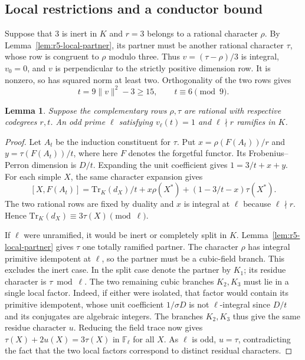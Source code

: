 \documentclass[11pt,a4paper]{article}
\newtheorem{lemma}[theorem]{Lemma}
\numberwithin{equation}{section}
\begin{document}
\subsection{Local restrictions and a conductor bound}
Suppose that $3$ is inert in $K$ and $r=3$ belongs to a rational
character $\rho$. By Lemma~\ref{lem:r5-local-partner}, its partner must
be another rational character $\tau$, whose row is congruent to
$\rho$ modulo three. Thus $v=(\tau-\rho)/3$ is integral,
$v_0=0$, and $v$ is perpendicular to the strictly positive dimension
row. It is nonzero, so has squared norm at least two. Orthogonality
of the two rows gives
\[
 t=9\|v\|^2-3\ge15,\qquad t\equiv6\pmod9.                  \tag{*}
\]
\begin{lemma}\label{lem:r5-odd-partner}
Suppose the complementary rows $\rho,\tau$ are rational with respective
codegrees $r,t$. An odd prime $\ell$ satisfying
$v_\ell(t)=1$ and $\ell\nmid r$ ramifies in $K$.
\end{lemma}
\begin{proof}
Let $A_t$ be the induction constituent for $\tau$. Put
$x=\rho(F(A_t))/r$ and $y=\tau(F(A_t))/t$, where here $F$ denotes
the forgetful functor. Its Frobenius--Perron dimension is $D/t$.
Expanding the unit coefficient gives $1=3/t+x+y$. For each simple
$X$, the same character expansion gives
\[
 [X,F(A_t)]=\mathrm{Tr}_K(d_X)/t+
                   x\rho(X^*)+(1-3/t-x)\tau(X^*).
\]
The two rational rows are fixed by duality and $x$ is integral at
$\ell$ because $\ell\nmid r$. Hence
$\mathrm{Tr}_K(d_X)\equiv3\tau(X)\pmod\ell$.

If $\ell$ were unramified, it would be inert or completely split in
$K$. Lemma~\ref{lem:r5-local-partner} gives $\tau$ one totally
ramified partner. The character $\rho$ has integral primitive idempotent
at $\ell$, so the partner must be a cubic-field branch. This excludes
the inert case. In the split case denote the partner by $K_1$; its
residue character is $\tau\bmod\ell$. The two remaining cubic
branches $K_2,K_3$ must lie in a single local factor. Indeed, if
either were isolated, that factor would contain its primitive
idempotent, whose unit coefficient $1/\sigma D$ is not
$\ell$-integral since $D/t$ and its conjugates are algebraic integers.
The branches $K_2,K_3$ thus give the same residue character $u$.
Reducing the field trace now gives
$\tau(X)+2u(X)=3\tau(X)$ in $\mathbb F_\ell$ for all $X$.
As $\ell$ is odd, $u=\tau$, contradicting the fact that the two
local factors correspond to distinct residual characters.
\end{proof}
\end{document}
